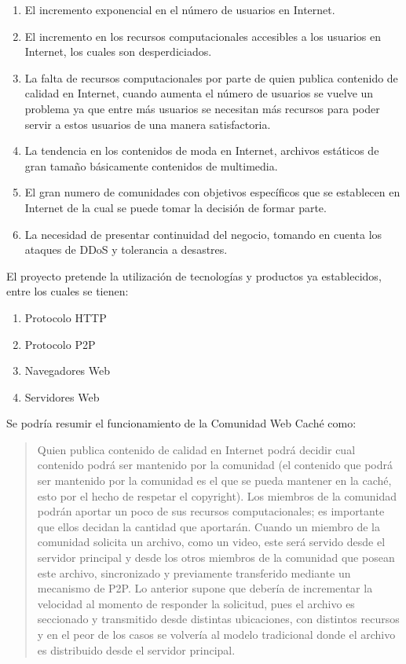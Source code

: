 \begin{enumerate}
\item El incremento exponencial en el número de usuarios en Internet.
\item El incremento en los recursos computacionales accesibles a los usuarios en Internet, los cuales son desperdiciados. 
\item La falta de recursos computacionales por parte de quien publica contenido de calidad en Internet, cuando aumenta el número de usuarios se vuelve un problema ya que entre más usuarios se necesitan más recursos para poder servir a estos usuarios de una manera satisfactoria.
\item La tendencia en los contenidos de moda en Internet, archivos estáticos de gran tamaño básicamente contenidos de multimedia.
\item El gran numero de comunidades con objetivos específicos que se establecen en Internet de la cual se puede tomar la decisión de formar parte.
\item La necesidad de presentar continuidad del negocio, tomando en cuenta los ataques de DDoS y tolerancia a desastres. 
\end{enumerate}
  
 
El proyecto pretende la utilización de tecnologías y productos ya establecidos, entre los cuales se tienen:

\begin{enumerate}
\item Protocolo HTTP
\item Protocolo P2P
\item Navegadores Web
\item Servidores Web
\end{enumerate}

Se podría resumir el funcionamiento de la Comunidad Web Caché como:
\begin{verse}
Quien publica contenido de calidad en Internet podrá decidir cual contenido podrá ser mantenido por la comunidad (el contenido que podrá ser mantenido por la comunidad es el que se pueda mantener en la caché, esto por el hecho de respetar el copyright). Los miembros de la comunidad podrán aportar un poco de sus recursos computacionales; es importante que ellos decidan la cantidad que aportarán. Cuando un miembro de la comunidad solicita un archivo, como un video, este será servido desde el servidor principal y desde los otros miembros de la comunidad que posean este archivo, sincronizado y previamente transferido mediante un mecanismo de P2P. Lo anterior supone que debería de incrementar la velocidad al momento de responder la solicitud, pues el archivo es seccionado y transmitido desde distintas ubicaciones, con distintos recursos y en el peor de los casos se volvería al modelo tradicional donde el archivo es distribuido desde el servidor principal. 
\end{verse}

